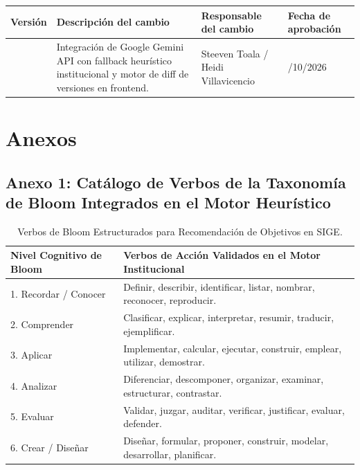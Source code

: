 \documentclass[12pt,a4paper]{article}
\begin{document}
\noindent
\renewcommand{\arraystretch}{1.2}
\begin{tabularx}{\textwidth}{|>{\hsize=0.45\hsize\centering\arraybackslash}X|>{\hsize=1.55\hsize\raggedright\arraybackslash}X|>{\hsize=1.2\hsize\raggedright\arraybackslash}X|>{\hsize=0.8\hsize\centering\arraybackslash}X|}
    \hline
    \rowcolor{tableheader}
    \textbf{Versión} & \textbf{Descripción del cambio} & \textbf{Responsable del cambio} & \textbf{Fecha de aprobación} \\
    \hline
    1.0 & Integración de Google Gemini API con fallback heurístico institucional y motor de diff de versiones en frontend. & Steeven Toala / Heidi Villavicencio & 07/10/2026 \\
    \hline
\end{tabularx}

\vspace{0.4cm}

\section{Anexos}

\subsection*{Anexo 1: Catálogo de Verbos de la Taxonomía de Bloom Integrados en el Motor Heurístico}
\begin{table}[H]
\centering
\small
\begin{tabularx}{\textwidth}{|l|X|}
\hline
\rowcolor{tableheader}
\textbf{Nivel Cognitivo de Bloom} & \textbf{Verbos de Acción Validados en el Motor Institucional} \\ \hline
1. Recordar / Conocer & Definir, describir, identificar, listar, nombrar, reconocer, reproducir. \\ \hline
2. Comprender & Clasificar, explicar, interpretar, resumir, traducir, ejemplificar. \\ \hline
3. Aplicar & Implementar, calcular, ejecutar, construir, emplear, utilizar, demostrar. \\ \hline
4. Analizar & Diferenciar, descomponer, organizar, examinar, estructurar, contrastar. \\ \hline
5. Evaluar & Validar, juzgar, auditar, verificar, justificar, evaluar, defender. \\ \hline
6. Crear / Diseñar & Diseñar, formular, proponer, construir, modelar, desarrollar, planificar. \\ \hline
\end{tabularx}
\caption{Verbos de Bloom Estructurados para Recomendación de Objetivos en SIGE.}
\label{tab:anexo_bloom}
\end{table}
\end{document}
